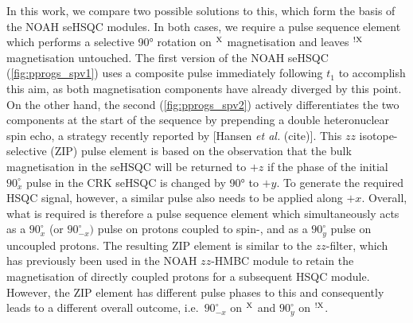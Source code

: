 \documentclass[11pt]{article}
\newcommand*{\proton}{\ce{^{1}H}}
\newcommand*{\magn}[1]{\ce{^1H}$^{#1}$}
\newcommand*{\magnnot}[1]{\ce{^1H}$^{!#1}$}
\begin{document}
In this work, we compare two possible solutions to this, which form the basis of the NOAH seHSQC modules.
In both cases, we require a pulse sequence element which performs a selective \ang{90} rotation on \magn{\ce{X}} magnetisation and leaves \magnnot{\ce{X}} magnetisation untouched.
The first version of the NOAH seHSQC (\cref{fig:pprogs_spv1}) uses a composite \proton{} pulse immediately following $t_1$ to accomplish this aim, as both magnetisation components have already diverged by this point.
On the other hand, the second (\cref{fig:pprogs_spv2}) actively differentiates the two components at the start of the sequence by prepending a double heteronuclear spin echo, a strategy recently reported by [Hansen \textit{et al.} (cite)].
This $zz$ isotope-selective (ZIP) pulse element is based on the observation that the bulk magnetisation in the seHSQC will be returned to $+z$ if the phase of the initial \proton{} $90^\circ_{x}$ pulse in the CRK seHSQC is changed by \ang{90} to $+y$.
To generate the required HSQC signal, however, a similar pulse also needs to be applied along $+x$.
Overall, what is required is therefore a pulse sequence element which simultaneously acts as a $90^\circ_x$ (or $90^\circ_{-x})$ pulse on protons coupled to spin-, and as a $90^\circ_y$ pulse on uncoupled protons.
The resulting ZIP element is similar to the $zz$-filter, which has previously been used in the NOAH $zz$-HMBC module to retain the magnetisation of directly coupled protons for a subsequent HSQC module.\autocite{Kupce2018CC, Kupce2019JMR}
However, the ZIP element has different pulse phases to this and consequently leads to a different overall outcome, i.e.\ $90^\circ_{-x}$ on \magn{\ce{X}} and $90^\circ_y$ on \magnnot{\ce{X}}.
\end{document}
